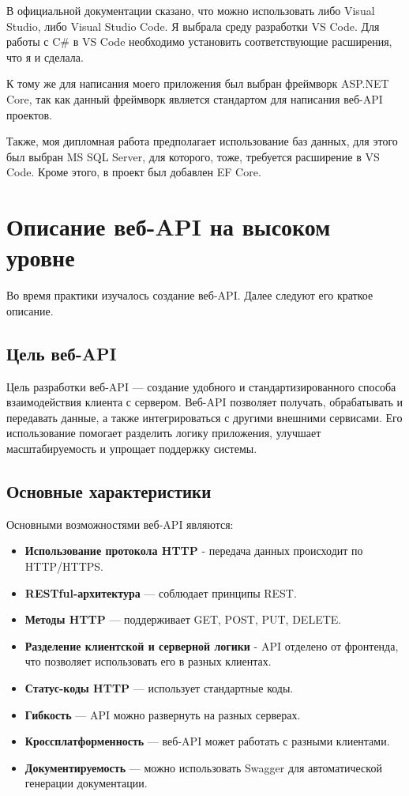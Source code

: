 \documentclass[a4paper,12pt]{report}
\begin{document}
В официальной документации сказано, что можно использовать либо Visual Studio, либо Visual Studio Code. Я выбрала среду разработки VS Code. 
Для работы с C\# в VS Code необходимо установить соответствующие расширения, что я и сделала.

К тому же для написания моего приложения был выбран фреймворк ASP.NET Core, так как данный фреймворк является стандартом для написания веб-\ac{API} проектов. 

Также, моя дипломная работа предполагает использование баз данных, для этого был выбран MS SQL Server, для которого, тоже, требуется расширение в VS Code. 
Кроме этого, в проект был добавлен \ac{EF} Core.

\section{Описание веб-\ac{API} на высоком уровне}

Во время практики изучалось создание веб-\ac{API}. Далее следуют его краткое описание.

\subsection{Цель веб-\ac{API}}

Цель разработки веб-\ac{API} --- создание удобного и стандартизированного способа взаимодействия клиента с сервером. 
Веб-\ac{API} позволяет получать, обрабатывать и передавать данные, а также интегрироваться с другими внешними сервисами. 
Его использование помогает разделить логику приложения, улучшает масштабируемость и упрощает поддержку системы.

\subsection{Основные характеристики}

Основными возможностями веб-\ac{API} являются:
\begin{itemize}
  \item
      \textbf{Использование протокола \ac{HTTP}} - передача данных происходит по \ac{HTTP}/\ac{HTTPS}.
  \item
      \textbf{\ac{REST}ful-архитектура} --- соблюдает принципы \ac{REST}.
  \item
      \textbf{Методы \ac{HTTP}} --- поддерживает GET, POST, PUT, DELETE.
  \item
      \textbf{Разделение клиентской и серверной логики} - \ac{API} отделено от фронтенда, что позволяет использовать его в разных клиентах.
  \item
      \textbf{Статус-коды \ac{HTTP}} --- использует стандартные коды.
  \item
      \textbf{Гибкость} --- \ac{API} можно развернуть на разных серверах.
  \item
      \textbf{Кроссплатформенность} --- веб-\ac{API} может работать с разными клиентами.
  \item
      \textbf{Документируемость} --- можно использовать Swagger для автоматической генерации документации.
\end{itemize}
\end{document}
